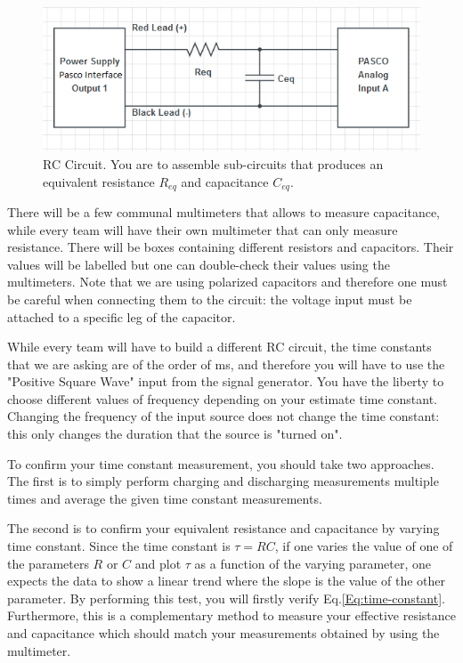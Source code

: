 \documentclass[12pt]{report}
\begin{document}
\begin{figure}[h]
\centering
\includegraphics[width=0.9\linewidth]{lab2-session2-circuit}
\caption{RC Circuit. You are to assemble sub-circuits that produces an equivalent resistance $R_{eq}$ and capacitance $C_{eq}$.}
\label{Fig:lab2-session2-circuit}
\end{figure}

There will be a few communal multimeters that allows to measure capacitance, while every team will have their own multimeter that can only measure resistance. There will be boxes containing different resistors and capacitors. Their values will be labelled but one can double-check their values using the multimeters. Note that we are using polarized capacitors and therefore one must be careful when connecting them to the circuit: the voltage input must be attached to a specific leg of the capacitor.

While every team will have to build a different RC circuit, the time constants that we are asking are of the order of ms, and therefore you will have to use the "Positive Square Wave" input from the signal generator. You have the liberty to choose different values of frequency depending on your estimate time constant. Changing the frequency of the input source does not change the time constant: this only changes the duration that the source is "turned on".

To confirm your time constant measurement, you should take two approaches. The first is to simply perform charging and discharging measurements multiple times and average the given time constant measurements.

The second is to confirm your equivalent resistance and capacitance by varying time constant. Since the time constant is $\tau = RC$, if one varies the value of one of the parameters $R$ or $C$ and plot $\tau$ as a function of the varying parameter, one expects the data to show a linear trend where the slope is the value of the other parameter. By performing this test, you will firstly verify Eq.\ref{Eq:time-constant}. Furthermore, this is a complementary method to measure your effective resistance and capacitance which should match your measurements obtained by using the multimeter.
\end{document}

